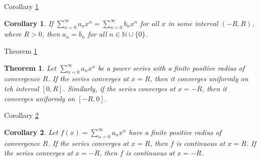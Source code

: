\documentclass[avery5371,grid]{flashcards}
\newtheorem{corollary}{Corollary}
\newtheorem{theorem}{Theorem}
\newcommand{\bb}[1]{\mathbb{#1}}
\newcommand{\N}{\bb{N}}
\begin{document}
\begin{flashcard}[Corollary]{Corollary \ref{cor12}}
\begin{corollary}
\label{cor12}
If $\displaystyle \sum _{n =0} ^{\infty} a_nx^n = \sum_{n=0}^{\infty} b_nx^n$
for all $x$ in some interval $(-R,R)$, where $R>0$, then
$a_n = b_n$ for all $n \in \N \cup \{ 0 \}$.
\end{corollary}
\end{flashcard}

\begin{flashcard}[Theorem]{Theorem \ref{thm123}}
\begin{theorem}
\label{thm123}
Let $\displaystyle \sum _{n=0}^{\infty} a_nx^n$ be a power
series with a finite positive radius of convergence $R$.  If the series
converges at $x=R$, then it converges uniformly on teh interval $[0,R]$. 
Similarly, if the series converges at $x=-R$, then it converges uniformly on
$[-R,0]$.
\end{theorem}
\end{flashcard}

\begin{flashcard}[Corollary]{Corollary \ref{cor13}}
\begin{corollary}
\label{cor13}
Let $\displaystyle f(x) = \sum _{n=0}^{\infty} a_nx^n$ have a
finite positive radius of convergence $R$.  If the series converges at $x=R$,
then $f$ is continuous at $x=R$.  If the series converges at $x=-R$, then $f$ is
continuous at $x=-R$.
\end{corollary} 
\end{flashcard}
\end{document}
